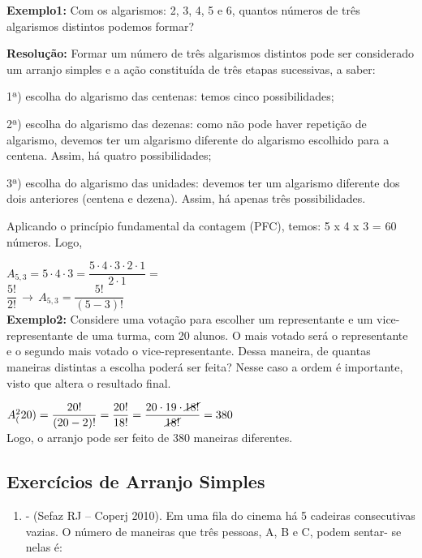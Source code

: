 \begin{multicols*}{2}
    \textbf{Exemplo1:} Com os algarismos: 2, 3, 4, 5 e 6, quantos números de três algarismos distintos podemos formar?

    \textbf{Resolução:} Formar um número de três algarismos distintos pode ser considerado um arranjo simples e a ação constituída de três etapas sucessivas, a saber:

    1ª) escolha do algarismo das centenas: temos cinco possibilidades;

    2ª) escolha do algarismo das dezenas: como não pode haver repetição de algarismo, devemos ter um algarismo diferente do algarismo escolhido para a centena. Assim, há quatro possibilidades;

    3ª) escolha do algarismo das unidades: devemos ter um algarismo diferente dos dois anteriores (centena e dezena). Assim, há apenas três possibilidades.

    Aplicando o princípio fundamental da contagem (PFC), temos: 5 x 4 x 3 = 60 números. Logo,

    $A_{5,3} = 5\cdot 4 \cdot 3 = \dfrac{5 \cdot 4 \cdot 3 \cdot 2 \cdot 1}{2 \cdot 1}=$\\

    $ \dfrac{5!}{2!} \, \rightarrow \, A_{5,3} = \dfrac{5!}{(5 - 3)!} $\\

    \textbf{Exemplo2: } Considere uma votação para escolher um representante e um vice-representante de uma turma, com 20 alunos. O mais votado será o representante e o segundo mais votado o vice-representante. Dessa maneira, de quantas maneiras distintas a escolha poderá ser feita? Nesse caso a ordem é importante, visto que altera o resultado final.

    $ A^2_(20) = \dfrac{20!}{(20 -2)!} = \dfrac{20!}{18!} = \dfrac{20 \cdot 19 \cdot \cancel{18!}}{\cancel{18!}} = 380$\\

    Logo, o arranjo pode ser feito de 380 maneiras diferentes.

    \subsection{Exercícios de Arranjo Simples}

    \begin{enumerate}

        \item - (Sefaz RJ – Coperj 2010). Em uma fila do cinema há 5 cadeiras consecutivas
              vazias. O número de maneiras que três pessoas, A, B e C, podem sentar- se nelas é:


\end{enumerate}
\end{multicols*}
